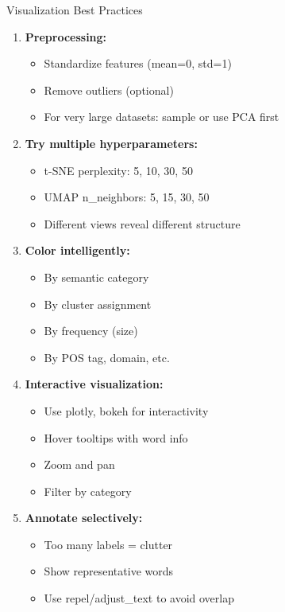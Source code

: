 \documentclass[aspectratio=169]{beamer}
\begin{document}
\begin{frame}[shrink=10]{Visualization Best Practices 🎨}
\begin{enumerate}\setlength{\itemsep}{0pt}
    \item \textbf{Preprocessing:}
    \begin{itemize}\setlength{\itemsep}{0pt}
        \item Standardize features (mean=0, std=1)
        \item Remove outliers (optional)
        \item For very large datasets: sample or use PCA first
    \end{itemize}

    \item \textbf{Try multiple hyperparameters:}
    \begin{itemize}\setlength{\itemsep}{0pt}
        \item t-SNE perplexity: 5, 10, 30, 50
        \item UMAP n\_neighbors: 5, 15, 30, 50
        \item Different views reveal different structure
    \end{itemize}

    \item \textbf{Color intelligently:}
    \begin{itemize}\setlength{\itemsep}{0pt}
        \item By semantic category
        \item By cluster assignment
        \item By frequency (size)
        \item By POS tag, domain, etc.
    \end{itemize}

    \item \textbf{Interactive visualization:}
    \begin{itemize}\setlength{\itemsep}{0pt}
        \item Use plotly, bokeh for interactivity
        \item Hover tooltips with word info
        \item Zoom and pan
        \item Filter by category
    \end{itemize}

    \item \textbf{Annotate selectively:}
    \begin{itemize}\setlength{\itemsep}{0pt}
        \item Too many labels = clutter
        \item Show representative words
        \item Use repel/adjust\_text to avoid overlap
    \end{itemize}
\end{enumerate}
\end{frame}
\end{document}
